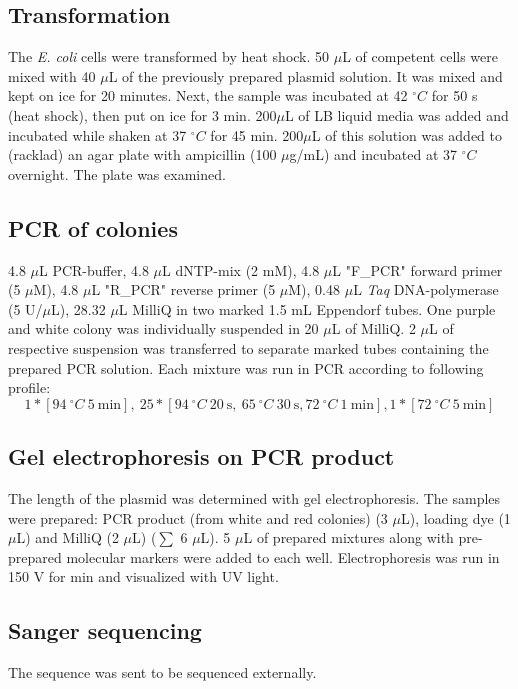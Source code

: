 \documentclass[11pt,a4paper]{article}
\begin{document}
\subsection{Transformation}
The \textit{E. coli} cells were transformed by heat shock. 50 $\mu$L of competent cells were mixed with 40 $\mu$L of the previously prepared plasmid solution. It was mixed and kept on ice for 20 minutes. Next, the sample was incubated at 42 $^\circ C$ for 50 s (heat shock), then put on ice for 3 min. 200$\mu$L of LB liquid media was added and incubated while shaken at 37 $^\circ C$ for 45 min. 200$\mu$L of this solution was added to (racklad) an agar plate with ampicillin (100 $\mu$g/mL) and incubated at 37 $^\circ C$ overnight. The plate was examined.

\subsection{PCR of colonies}
4.8 $\mu$L PCR-buffer, 4.8 $\mu$L dNTP-mix (2 mM), 4.8 $\mu$L "F\_PCR" forward primer (5 $\mu$M), 4.8 $\mu$L "R\_PCR" reverse primer (5 $\mu$M), 0.48 $\mu$L \textit{Taq} DNA-polymerase (5 U/$\mu$L), 28.32 $\mu$L MilliQ in two marked 1.5 mL Eppendorf tubes. One purple and white colony was individually suspended in 20 $\mu$L of MilliQ. 2 $\mu$L of respective suspension was transferred to separate marked tubes containing the prepared PCR solution.  Each mixture was run in PCR according to following profile: $$1*[94 \: ^{\circ}C \: 5 \: \textrm{min}], \: 25*[94 \: ^{\circ}C \: 20 \: \textrm{s}, \: 65 \: ^{\circ}C \: 30 \: \textrm{s}, 72 \: ^{\circ}C \: 1 \: \textrm{min}], 1*[72 \: ^{\circ}C\: 5 \: \textrm{min}]$$

\subsection{Gel electrophoresis on PCR product}
The length of the plasmid was determined with gel electrophoresis. The samples were prepared: PCR product (from white and red colonies) (3 $\mu$L), loading dye (1 $\mu$L) and MilliQ (2 $\mu$L) ($\sum$ 6 $\mu$L). 5 $\mu$L of prepared mixtures along with pre-prepared molecular markers were added to each well. Electrophoresis was run in 150 V for  min and visualized with UV light.

\subsection{Sanger sequencing}
The sequence was sent to be sequenced externally.
\end{document}
